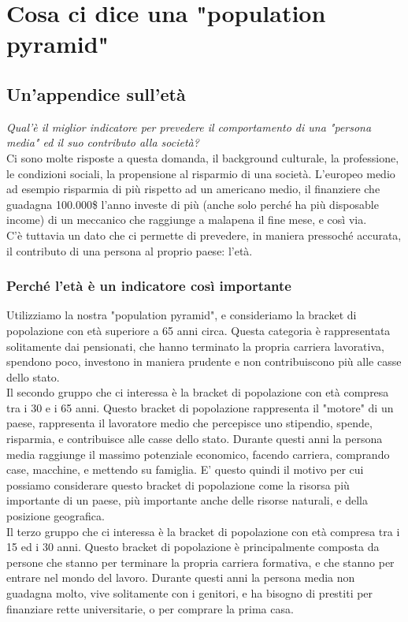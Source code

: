 \documentclass[11pt, oneside]{article}   	%
\begin{document}
\section{Cosa ci dice una "population pyramid"}
\subsection{Un'appendice sull'età}
\emph{Qual'è il miglior indicatore per prevedere il comportamento di una "persona media" ed il suo contributo alla società?}\\
Ci sono molte risposte a questa domanda, il background culturale, la professione, le condizioni sociali, la propensione al risparmio di una società. L'europeo medio ad esempio risparmia di più rispetto ad un americano medio, il finanziere che guadagna 100.000\$ l'anno investe di più (anche solo perché ha più disposable income) di un meccanico che raggiunge a malapena il fine mese, e così via.\\
C'è tuttavia un dato che ci permette di prevedere, in maniera pressoché accurata, il contributo di una persona al proprio paese: l'età.

\subsubsection{Perché l'età è un indicatore così importante}
Utilizziamo la nostra "population pyramid", e consideriamo la bracket di popolazione con età superiore a 65 anni circa. Questa categoria è rappresentata solitamente dai pensionati, che hanno terminato la propria carriera lavorativa, spendono poco, investono in maniera prudente e non contribuiscono più alle casse dello stato. \\

Il secondo gruppo che ci interessa è la bracket di popolazione con età compresa tra i 30 e i 65 anni. Questo bracket di popolazione rappresenta il "motore" di un paese, rappresenta il lavoratore medio che percepisce uno stipendio, spende, risparmia, e contribuisce alle casse dello stato. Durante questi anni la persona media raggiunge il massimo potenziale economico, facendo carriera, comprando case, macchine, e mettendo su famiglia. E' questo quindi il motivo per cui possiamo considerare questo bracket di popolazione come la risorsa più importante di un paese, più importante anche delle risorse naturali, e della posizione geografica.\\

Il terzo gruppo che ci interessa è la bracket di popolazione con età compresa tra i 15 ed i 30 anni. Questo bracket di popolazione è principalmente composta da persone che stanno per terminare la propria carriera formativa, e che stanno per entrare nel mondo del lavoro.
Durante questi anni la persona media non guadagna molto, vive solitamente con i genitori, e ha bisogno di prestiti per finanziare rette universitarie, o per comprare la prima casa.\\
\end{document}
